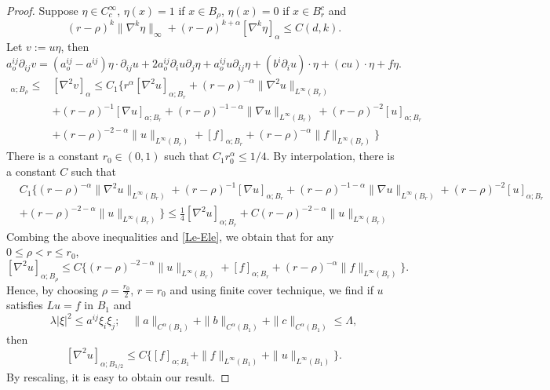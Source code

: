 \documentclass[twoside, 12pt]{book}
\numberwithin{equation}{chapter}
\def\leq{\leqslant}
\def\p{\partial}
\begin{document}
	\begin{proof}
		Suppose $\eta\in C_c^\infty$, $\eta(x)=1$ if $x\in B_{\rho}$, $\eta(x)=0$ if $x\in B^c_{r}$ and 
		$$(r-\rho)^{k}\|\nabla^k \eta \|_\infty+(r-\rho)^{k+\alpha}[\nabla^k \eta]_{\alpha}  \leq C(d, k). $$ 
		Let $v:=u\eta$, then 
		$$
		a^{ij}_o \p_{ij} v= (a^{ij}_o-a^{ij})\eta\cdot \p_{ij} u+2a^{ij}_o \p_i u\p_j \eta+ a^{ij}_o u\p_{ij}\eta+(b^i \p_i u )\cdot\eta+ (cu)\cdot \eta+ f\eta. 
		$$
		\begin{align*}
			[\nabla^2 u]_{\alpha; B_{\rho}}\leq& [\nabla^2 v]_\alpha\leq  C_1\Big\{  r^\alpha[\nabla^2 u]_{\alpha; B_{r}}+(r-\rho)^{-\alpha} \|\nabla^2 u\|_{L^\infty(B_{r})}\\
			&+ (r-\rho)^{-1} [\nabla u]_{\alpha; B_{r}}+(r-\rho)^{-1-\alpha} \|\nabla u\|_{L^\infty(B_{r})}+ (r-\rho)^{-2} [u]_{\alpha; B_{r}}\\
			&+(r-\rho)^{-2-\alpha} \|u\|_{L^\infty(B_{r})}+[f]_{\alpha; B_{r}}+(r-\rho)^{-\alpha}\|f\|_{L^\infty(B_{r})}\Big\}
		\end{align*}
		There is a constant $r_0\in (0,1)$ such that $C_1 r_0^\alpha\leq 1/4$. By interpolation, there is a constant $C$ such that 
		\begin{align*}
			&C_1\Big\{ (r-\rho)^{-\alpha} \|\nabla^2 u\|_{L^\infty(B_{r})}+ (r-\rho)^{-1} [\nabla u]_{\alpha; B_{r}}+(r-\rho)^{-1-\alpha} \|\nabla u\|_{L^\infty(B_{r})}+ (r-\rho)^{-2} [u]_{\alpha; B_{r}}\\
			&+(r-\rho)^{-2-\alpha} \|u\|_{L^\infty(B_{r})}\Big\}
			\leq \frac{1}{4} [\nabla^2 u]_{\alpha; B_{r}} +C (r-\rho)^{-2-\alpha} \|u\|_{L^\infty(B_r)}
		\end{align*}
		Combing the above inequalities and \ref{Le-Ele}, we obtain that for any $0\leq \rho<r\leq r_0$, 
		$$
		[\nabla^2 u]_{\alpha; B_\rho}\leq C \Big\{(r-\rho)^{-2-\alpha} \|u\|_{L^\infty(B_r)}+ [f]_{\alpha; B_{r}}+(r-\rho)^{-\alpha}\|f\|_{L^\infty(B_{r})}\Big\}.
		$$
		Hence, by choosing $\rho=\tfrac{r_0}{2}$, $r=r_0$ and using finite cover technique, we find if $u$ satisfies $Lu=f$ in $B_1$ and 
		$$\lambda |\xi|^2\leq a^{ij}\xi_i\xi_j; \quad \|a\|_{C^\alpha(B_1)}+\|b\|_{C^\alpha(B_1)}+\|c\|_{C^\alpha(B_1)}\leq \Lambda, $$
		then 
		$$
		[\nabla^2 u]_{\alpha; B_{1/2}}\leq C \Big\{ [f]_{\alpha;B_1} + \|f\|_{L^\infty(B_1)}+ \|u\|_{L^\infty(B_1)} \Big\}. 
		$$
		By rescaling, it is easy to obtain our result. 
	\end{proof}
	
	
	
	
	
    
	

	 
	
	
	
\end{document}
